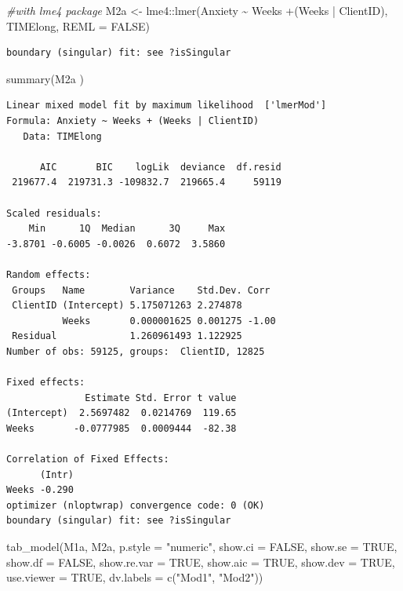 \documentclass[
  11pt,
]{book}
\newenvironment{Shaded}{\begin{snugshade}}{\end{snugshade}}
\newcommand{\AttributeTok}[1]{\textcolor[rgb]{0.77,0.63,0.00}{#1}}
\newcommand{\CommentTok}[1]{\textcolor[rgb]{0.56,0.35,0.01}{\textit{#1}}}
\newcommand{\ConstantTok}[1]{\textcolor[rgb]{0.00,0.00,0.00}{#1}}
\newcommand{\FunctionTok}[1]{\textcolor[rgb]{0.00,0.00,0.00}{#1}}
\newcommand{\NormalTok}[1]{#1}
\newcommand{\OtherTok}[1]{\textcolor[rgb]{0.56,0.35,0.01}{#1}}
\newcommand{\SpecialCharTok}[1]{\textcolor[rgb]{0.00,0.00,0.00}{#1}}
\newcommand{\StringTok}[1]{\textcolor[rgb]{0.31,0.60,0.02}{#1}}
\begin{document}
\begin{Shaded}
\begin{Highlighting}[]
\CommentTok{\#with lme4 package}
\NormalTok{M2a }\OtherTok{\textless{}{-}}\NormalTok{ lme4}\SpecialCharTok{::}\FunctionTok{lmer}\NormalTok{(Anxiety }\SpecialCharTok{\textasciitilde{}}\NormalTok{ Weeks }\SpecialCharTok{+}\NormalTok{(Weeks }\SpecialCharTok{|}\NormalTok{ ClientID), TIMElong, }\AttributeTok{REML =} \ConstantTok{FALSE}\NormalTok{)}
\end{Highlighting}
\end{Shaded}

\begin{verbatim}
boundary (singular) fit: see ?isSingular
\end{verbatim}

\begin{Shaded}
\begin{Highlighting}[]
\FunctionTok{summary}\NormalTok{(M2a )}
\end{Highlighting}
\end{Shaded}

\begin{verbatim}
Linear mixed model fit by maximum likelihood  ['lmerMod']
Formula: Anxiety ~ Weeks + (Weeks | ClientID)
   Data: TIMElong

      AIC       BIC    logLik  deviance  df.resid 
 219677.4  219731.3 -109832.7  219665.4     59119 

Scaled residuals: 
    Min      1Q  Median      3Q     Max 
-3.8701 -0.6005 -0.0026  0.6072  3.5860 

Random effects:
 Groups   Name        Variance    Std.Dev. Corr 
 ClientID (Intercept) 5.175071263 2.274878      
          Weeks       0.000001625 0.001275 -1.00
 Residual             1.260961493 1.122925      
Number of obs: 59125, groups:  ClientID, 12825

Fixed effects:
              Estimate Std. Error t value
(Intercept)  2.5697482  0.0214769  119.65
Weeks       -0.0777985  0.0009444  -82.38

Correlation of Fixed Effects:
      (Intr)
Weeks -0.290
optimizer (nloptwrap) convergence code: 0 (OK)
boundary (singular) fit: see ?isSingular
\end{verbatim}

\begin{Shaded}
\begin{Highlighting}[]
\FunctionTok{tab\_model}\NormalTok{(M1a, M2a, }\AttributeTok{p.style =} \StringTok{"numeric"}\NormalTok{, }\AttributeTok{show.ci =} \ConstantTok{FALSE}\NormalTok{, }\AttributeTok{show.se =} \ConstantTok{TRUE}\NormalTok{, }\AttributeTok{show.df =} \ConstantTok{FALSE}\NormalTok{, }\AttributeTok{show.re.var =} \ConstantTok{TRUE}\NormalTok{, }\AttributeTok{show.aic =} \ConstantTok{TRUE}\NormalTok{, }\AttributeTok{show.dev =} \ConstantTok{TRUE}\NormalTok{, }\AttributeTok{use.viewer =} \ConstantTok{TRUE}\NormalTok{, }\AttributeTok{dv.labels =} \FunctionTok{c}\NormalTok{(}\StringTok{"Mod1"}\NormalTok{, }\StringTok{"Mod2"}\NormalTok{))}
\end{Highlighting}
\end{Shaded}
\end{document}
